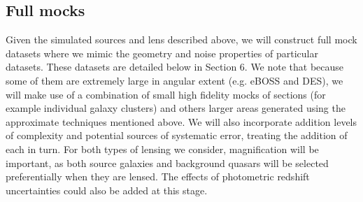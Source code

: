 \subsection{Full mocks}

Given the simulated sources and lens described above, we will construct
full mock datasets where we mimic the geometry and noise properties
of particular datasets. These datasets are detailed below in Section 6.
We note that because some of them are extremely large in
angular extent (e.g. eBOSS and DES), we will make use of a combination of
small high fidelity mocks of sections (for example individual 
galaxy clusters) and others larger areas generated using the approximate 
techniques mentioned above.
We will also incorporate addition levels of
complexity and potential sources of systematic
error, treating the addition of each in turn. For both types of
lensing we consider, magnification will be important, as both source
galaxies and background quasars will be selected preferentially when
they are lensed. The effects of photometric redshift uncertainties
could also  be added 
at this stage.   
